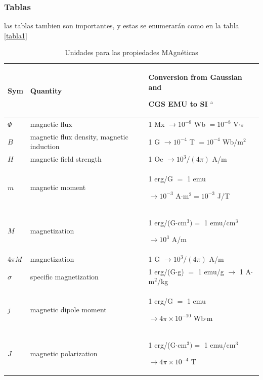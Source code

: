 \documentclass[a4paper]{IEEEtran} %
\begin{document}
\subsubsection{Tablas}
las tablas tambien son importantes, y estas se enumerarán como en la tabla \eqref{tabla1}
\begin{table}
\caption{Unidades para las propiedades MAgnéticas} %
\label{tabla1} %
\setlength{\tabcolsep}{3pt}%
\begin{tabular}{|p{25pt}|p{75pt}|p{115pt}|} %
\hline %
Sym            & Quantity                               & Conversion from Gaussian and \par CGS EMU to SI $^{\mathrm{a}}$ \\
\hline
$\Phi $        & magnetic flux                          & 1 Mx $\to  10^{-8}$ Wb $= 10^{-8}$ V$\cdot $s \\
$B$            & magnetic flux density, magnetic induction    & 1 G $\to  10^{-4}$ T $= 10^{-4}$ Wb/m$^{2}$ \\
$H$            & magnetic field strength                & 1 Oe $\to  10^{3}/(4\pi )$ A/m \\
$m$            & magnetic moment                        & 1 erg/G $=$ 1 emu \par $\to 10^{-3}$ A$\cdot $m$^{2} = 10^{-3}$ J/T \\
$M$            & magnetization                          & 1 erg/(G$\cdot $cm$^{3}) =$ 1 emu/cm$^{3}$ \par $\to 10^{3}$ A/m \\
4$\pi M$       & magnetization                          & 1 G $\to  10^{3}/(4\pi )$ A/m \\
$\sigma $      & specific magnetization                 & 1 erg/(G$\cdot $g) $=$ 1 emu/g $\to $ 1 A$\cdot $m$^{2}$/kg \\
$j$            & magnetic dipole moment                 & 1 erg/G $=$ 1 emu \par $\to 4\pi \times  10^{-10}$ Wb$\cdot $m \\
$J$            & magnetic polarization                  & 1 erg/(G$\cdot $cm$^{3}) =$ 1 emu/cm$^{3}$ \par $\to 4\pi \times  10^{-4}$ T \\

\end{tabular}
\end{table}
\end{document}

